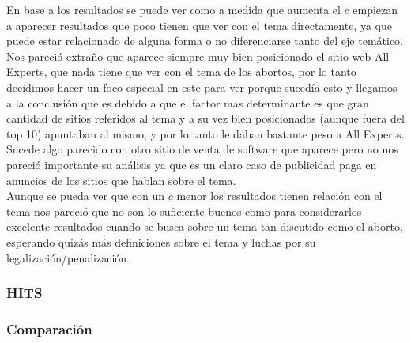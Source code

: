 En base a los resultados se puede ver como a medida que aumenta el $c$ empiezan a aparecer resultados que poco tienen que ver con el tema directamente, ya que puede estar relacionado de alguna forma o no diferenciarse tanto del eje temático.\\
Nos pareció extraño que aparece siempre muy bien posicionado el sitio web All Experts, que nada tiene que ver con el tema de los abortos, por lo tanto decidimos hacer un foco especial en este para ver porque sucedía esto y llegamos a la conclusión que es debido a que el factor mas determinante es que gran cantidad de sitios referidos al tema y a su vez bien posicionados (aunque fuera del top 10) apuntaban al mismo, y por lo tanto le daban bastante peso a All Experts.\\
Sucede algo parecido con otro sitio de venta de software que aparece pero no nos pareció importante su análisis ya que es un claro caso de publicidad paga en anuncios de los sitios que hablan sobre el tema.\\
Aunque se pueda ver que con un $c$ menor los resultados tienen relación con el tema nos pareció que no son lo suficiente buenos como para considerarlos excelente resultados cuando se busca sobre un tema tan discutido como el aborto, esperando quizás más definiciones sobre el tema y luchas por su legalización/penalización. 

\subsubsection{HITS}

\subsubsection{Comparación}

